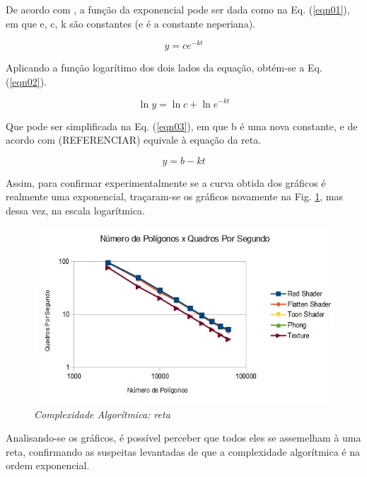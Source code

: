 	De acordo com \cite{calculo}, a função da exponencial pode ser dada como na Eq. 
(\ref{eqn01}), em que e, c, k são constantes (e  é a constante neperiana).  

	\begin{equation}
	\label{eqn01}
		y = ce^{-kt}
	\end{equation}

	Aplicando a função logarítimo dos dois lados da equação, obtém-se a  Eq. 
(\ref{eqn02}).

	\begin{equation}
	\label{eqn02}
		\ln{y} = \ln{c}  + \ln{e^{-kt}}
	\end{equation}
 
	Que pode ser simplificada na  Eq. 
(\ref{eqn03}), em que b é uma nova constante, e de acordo com (REFERENCIAR) equivale à equação da reta. 

	\begin{equation}
	\label{eqn03}
		y = b  - kt
	\end{equation}	

	Assim, para confirmar experimentalmente se a  curva obtida dos gráficos é realmente uma exponencial, traçaram-se os gráficos novamente na Fig. \ref{complexidade_reta}, mas dessa vez, na escala logarítmica. 

	\begin{figure}[h]
	\centering
		\includegraphics[keepaspectratio=true,scale=1.0]{figuras/complexidade_reta.jpg}
	\caption{\textit{Complexidade Algorítmica: reta}}
	\label{complexidade_reta}
	\end{figure}

	Analisando-se os gráficos, é possível perceber que todos eles se assemelham à uma reta, confirmando as suspeitas levantadas de que a complexidade algorítmica é na ordem exponencial.

